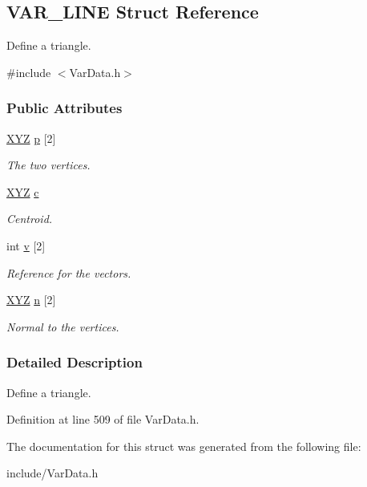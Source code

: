 \hypertarget{structVAR__LINE}{}\subsection{V\+A\+R\+\_\+\+L\+I\+NE Struct Reference}
\label{structVAR__LINE}


Define a triangle.  




{\ttfamily \#include $<$Var\+Data.\+h$>$}

\subsubsection*{Public Attributes}
\begin{DoxyCompactItemize}
\item 
\hyperlink{structXYZ}{X\+YZ} \hyperlink{structVAR__LINE_a411315336ef1ae37448e44ee3cc83503}{p} \mbox{[}2\mbox{]}\hypertarget{structVAR__LINE_a411315336ef1ae37448e44ee3cc83503}{}\label{structVAR__LINE_a411315336ef1ae37448e44ee3cc83503}

\begin{DoxyCompactList}\small\item\em The two vertices. \end{DoxyCompactList}\item 
\hyperlink{structXYZ}{X\+YZ} \hyperlink{structVAR__LINE_ae93aa7b3bc74295f6f1118a6b0a0e804}{c}\hypertarget{structVAR__LINE_ae93aa7b3bc74295f6f1118a6b0a0e804}{}\label{structVAR__LINE_ae93aa7b3bc74295f6f1118a6b0a0e804}

\begin{DoxyCompactList}\small\item\em Centroid. \end{DoxyCompactList}\item 
int \hyperlink{structVAR__LINE_aa8fc460cb352395b8303f6bd1f49c9ad}{v} \mbox{[}2\mbox{]}\hypertarget{structVAR__LINE_aa8fc460cb352395b8303f6bd1f49c9ad}{}\label{structVAR__LINE_aa8fc460cb352395b8303f6bd1f49c9ad}

\begin{DoxyCompactList}\small\item\em Reference for the vectors. \end{DoxyCompactList}\item 
\hyperlink{structXYZ}{X\+YZ} \hyperlink{structVAR__LINE_a5da38476370426c07250979c5c998715}{n} \mbox{[}2\mbox{]}\hypertarget{structVAR__LINE_a5da38476370426c07250979c5c998715}{}\label{structVAR__LINE_a5da38476370426c07250979c5c998715}

\begin{DoxyCompactList}\small\item\em Normal to the vertices. \end{DoxyCompactList}\end{DoxyCompactItemize}


\subsubsection{Detailed Description}
Define a triangle. 

Definition at line 509 of file Var\+Data.\+h.



The documentation for this struct was generated from the following file\+:\begin{DoxyCompactItemize}
\item 
include/Var\+Data.\+h\end{DoxyCompactItemize}
